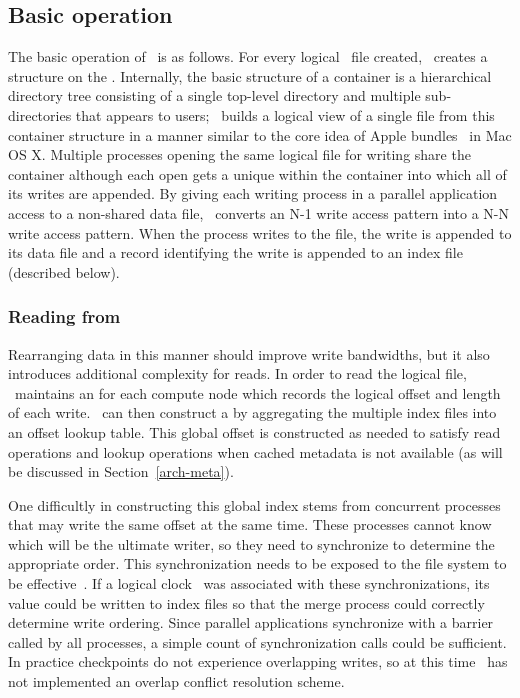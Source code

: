 \subsection{Basic operation}
The basic operation of \plfs\ is as follows. For every logical \plfs\ file
created, \plfs\ creates a  structure on the \upfs. Internally,
the basic structure of a container is a hierarchical directory tree consisting
of a single top-level directory and multiple sub-directories that appears to
users; \plfs\ builds a logical view of a single file from this container
structure in a manner similar to the core idea of Apple
bundles~\cite{bundles} in Mac OS X.  Multiple processes opening the same
logical file for writing share the container although each open gets a unique
 within the container into which all of its writes are
appended. By giving each writing process in a parallel application access to a
non-shared data file, \plfs\ converts an N-1 write access pattern into a N-N
write access pattern.  When the process writes to the file, the write is
appended to its data file and a record identifying the write is appended to an
index file (described below). 


\subsubsection{Reading from \plfs}
\label{arch-read}
Rearranging data in this manner should improve write bandwidths, but
it also introduces additional complexity for reads. In order to read 
the logical file, \plfs\ maintains an  for each compute
node which records the logical offset and length of each write. \plfs\ can
then construct a  by aggregating the multiple index files 
into an offset lookup table.  This global offset is constructed as needed to
satisfy read operations and lookup operations when cached metadata is not
available (as will be discussed in Section~\ref{arch-meta}).

One difficultly in constructing this global index stems from concurrent
processes that may write the same offset at the same time.  These processes
cannot know which will be the ultimate writer, so they need to synchronize to
determine the appropriate order. This synchronization needs to be exposed to
the file system to be effective~\cite{Gibson95thescotch}. If a logical
clock~\cite{lamport1978} was associated with these synchronizations, its value
could be written to index files so that the merge process could correctly
determine write ordering. Since parallel applications synchronize with a
barrier called by all processes, a simple count of synchronization calls could
be sufficient. In practice checkpoints do not experience overlapping writes, so
at this time \plfs\ has not implemented an overlap conflict resolution scheme.

